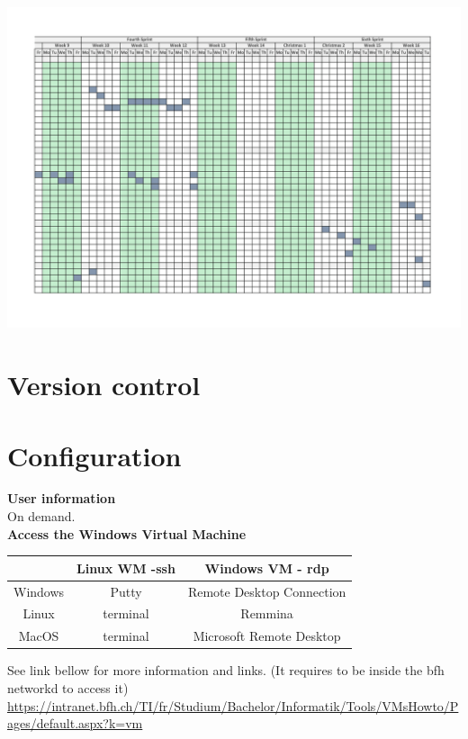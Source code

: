\documentclass{scrbook}
\begin{document}
\begin{center}
  \includegraphics[scale = 0.28,  angle=-90]{./Gantt-2}
\end{center}

\chapter{Version control}

\chapter{Configuration}

\textbf{User information} \\
On demand.\\

\textbf{Access the Windows Virtual Machine}\\
\begin{center}
  \begin{tabular}{|c|c|c|}
    \hline
     & Linux WM -ssh & Windows VM - rdp \\
    \hline
    Windows & Putty & Remote Desktop Connection \\
    \hline
    Linux & terminal & Remmina \\
    \hline
    MacOS & terminal & Microsoft Remote Desktop \\
    \hline
  \end{tabular}
\end{center}

See link bellow for more information and links. (It requires to be inside the bfh networkd to access it)
\url{https://intranet.bfh.ch/TI/fr/Studium/Bachelor/Informatik/Tools/VMsHowto/Pages/default.aspx?k=vm}
\end{document}

